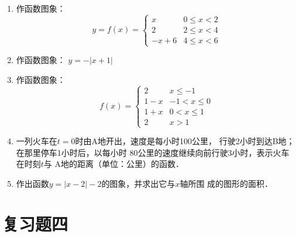 
\begin{enumerate}
    \item 作函数图象：
   \[y=f(x)=\begin{cases}
       x& 0\le x<2\\
       2& 2\le x<4\\
       -x+6 & 4\le x<6
   \end{cases}\]
   \item 作函数图象：
    $y=-|x+1|$
    \item 作函数图象：
   \[f(x)=\begin{cases}
       2& x\le -1\\
       1-x& -1<x\le 0\\
       1+x & 0<x\le 1\\
       2& x>1
   \end{cases}\]
    \item 一列火车在$t=0$时由A地开出，速度是每小时100公里，
    行驶2小时到达B地；在那里停车1小时后，以每小时
    80公里的速度继续向前行驶3小时，表示火车在时刻$t$与
    A地的距离（单位：公里）的函数．
    \item 作出函数$y=|x-2|-2$的图象，并求出它与$x$轴所围
    成的图形的面积．
\end{enumerate}

\section*{复习题四}

